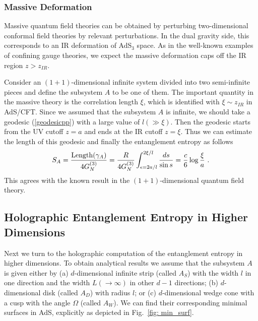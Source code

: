 \documentclass[12pt]{article}
\def\ep{{\epsilon}}
\def\frac#1#2{{#1\over #2}}
\def\f {\frac}
\def\ep{\epsilon}
\def\ep{{\epsilon}}
\def\frac#1#2{{#1\over #2}}
\def\be{\begin{equation}}
\def\ee{\end{equation}}
\begin{document}
\subsubsection{Massive Deformation}
\label{massive deform} \hspace{5mm}
Massive quantum field theories can
be obtained by perturbing two-dimensional conformal field theories by
relevant perturbations. In the dual gravity side, this corresponds to
an IR deformation of AdS$_3$ space. As in the
well-known examples \cite{Witten,KlSt,PoSt,MaNu} of confining gauge theories,
we expect the massive deformation caps off the IR region $z>z_{IR}$.

Consider an $(1+1)$-dimensional infinite system divided into two
semi-infinite pieces and define the subsystem $A$ to be one of them.
The important quantity in the massive theory is the
correlation length $\xi$, which is identified with $\xi\sim z_{IR}$
in AdS/CFT. Since we assumed that the subsystem $A$ is
infinite, we should take a geodesic (\ref{geodesicpp}) with a large
value of $l(\gg\xi)$. Then the geodesic starts from the UV cutoff $z=a$
and ends at the IR cutoff $z=\xi$. Thus we can estimate the length of this
geodesic and finally the entanglement entropy as follows
 \be S_A=\f{{\rm
Length}(\gamma_A)}{4G^{(3)}_N}=
\f{R}{4G^{(3)}_N}\int^{2\xi/l}_{\ep=2a/l}\f{ds}{\sin
s}=\f{c}{6}\log\f{\xi}{a} \ .\label{entrpmas}
\ee This agrees with the known result \cite{Vidal03,Cardy} in
the $(1+1)$-dimensional quantum field theory.




\subsection{Holographic Entanglement Entropy in Higher Dimensions}
\label{AdS d+2/CFT d+1} \hspace{5mm}
Next we turn to the holographic computation of the entanglement entropy in
higher dimensions. To obtain analytical results we assume that the subsystem
$A$ is given either by
(a) $d$-dimensional infinite strip (called $A_S$) with the width $l$
in one direction and the width $L(\to\infty)$ in other $d-1$ directions;
(b) $d$-dimensional disk (called $A_D$) with radius $l$; or
(c) $d$-dimensional wedge cone with a cusp with the angle $\Omega$ (called $A_W$).
We can find their corresponding minimal surfaces in AdS, explicitly as
depicted in Fig.\ \ref{fig: min_surf}.
\end{document}
